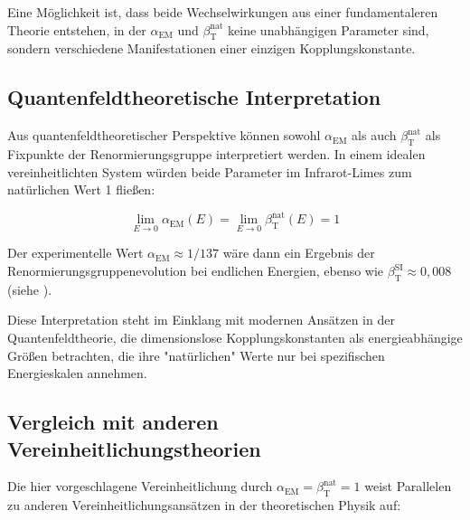 \documentclass[12pt,a4paper]{article}
\newcommand{\alphaEM}{\alpha_{\text{EM}}}
\newcommand{\betaT}{\beta_{\text{T}}}
\begin{document}
	Eine Möglichkeit ist, dass beide Wechselwirkungen aus einer fundamentaleren Theorie entstehen, in der \(\alphaEM\) und \(\betaT^{\text{nat}}\) keine unabhängigen Parameter sind, sondern verschiedene Manifestationen einer einzigen Kopplungskonstante.
	
	\subsection{Quantenfeldtheoretische Interpretation}
	\label{subsec:qft_interpretation}
	
	Aus quantenfeldtheoretischer Perspektive können sowohl \(\alphaEM\) als auch \(\betaT^{\text{nat}}\) als Fixpunkte der Renormierungsgruppe interpretiert werden. In einem idealen vereinheitlichten System würden beide Parameter im Infrarot-Limes zum natürlichen Wert 1 fließen:
	
	\begin{equation}
		\lim_{E \to 0} \alphaEM(E) = \lim_{E \to 0} \betaT^{\text{nat}}(E) = 1
	\end{equation}
	
	Der experimentelle Wert \(\alphaEM \approx 1/137\) wäre dann ein Ergebnis der Renormierungsgruppenevolution bei endlichen Energien, ebenso wie \(\betaT^{\text{SI}} \approx 0,008\) (siehe \cite{pascher_erweiterung_2025}).
	
	Diese Interpretation steht im Einklang mit modernen Ansätzen in der Quantenfeldtheorie, die dimensionslose Kopplungskonstanten als energieabhängige Größen betrachten, die ihre "natürlichen" Werte nur bei spezifischen Energieskalen annehmen.
	
	\subsection{Vergleich mit anderen Vereinheitlichungstheorien}
	\label{subsec:comparison}
	
	Die hier vorgeschlagene Vereinheitlichung durch \(\alphaEM = \betaT^{\text{nat}} = 1\) weist Parallelen zu anderen Vereinheitlichungsansätzen in der theoretischen Physik auf:
	
\end{document}
